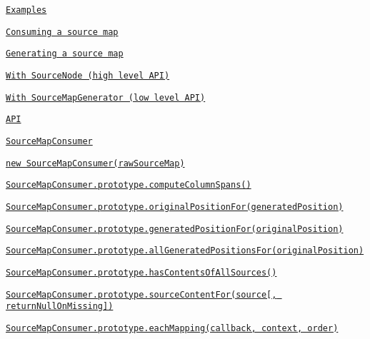 \begin{DoxyItemize}
\item \href{#examples}{\tt Examples}
\begin{DoxyItemize}
\item \href{#consuming-a-source-map}{\tt Consuming a source map}
\item \href{#generating-a-source-map}{\tt Generating a source map}
\begin{DoxyItemize}
\item \href{#with-sourcenode-high-level-api}{\tt With Source\+Node (high level A\+PI)}
\item \href{#with-sourcemapgenerator-low-level-api}{\tt With Source\+Map\+Generator (low level A\+PI)}
\end{DoxyItemize}
\end{DoxyItemize}
\item \href{#api}{\tt A\+PI}
\begin{DoxyItemize}
\item \href{#sourcemapconsumer}{\tt Source\+Map\+Consumer}
\begin{DoxyItemize}
\item \href{#new-sourcemapconsumerrawsourcemap}{\tt new Source\+Map\+Consumer(raw\+Source\+Map)}
\item \href{#sourcemapconsumerprototypecomputecolumnspans}{\tt Source\+Map\+Consumer.\+prototype.\+compute\+Column\+Spans()}
\item \href{#sourcemapconsumerprototypeoriginalpositionforgeneratedposition}{\tt Source\+Map\+Consumer.\+prototype.\+original\+Position\+For(generated\+Position)}
\item \href{#sourcemapconsumerprototypegeneratedpositionfororiginalposition}{\tt Source\+Map\+Consumer.\+prototype.\+generated\+Position\+For(original\+Position)}
\item \href{#sourcemapconsumerprototypeallgeneratedpositionsfororiginalposition}{\tt Source\+Map\+Consumer.\+prototype.\+all\+Generated\+Positions\+For(original\+Position)}
\item \href{#sourcemapconsumerprototypehascontentsofallsources}{\tt Source\+Map\+Consumer.\+prototype.\+has\+Contents\+Of\+All\+Sources()}
\item \href{#sourcemapconsumerprototypesourcecontentforsource-returnnullonmissing}{\tt Source\+Map\+Consumer.\+prototype.\+source\+Content\+For(source\mbox{[}, return\+Null\+On\+Missing\mbox{]})}
\item \href{#sourcemapconsumerprototypeeachmappingcallback-context-order}{\tt Source\+Map\+Consumer.\+prototype.\+each\+Mapping(callback, context, order)}

\end{DoxyItemize}
\end{DoxyItemize}
\end{DoxyItemize}

